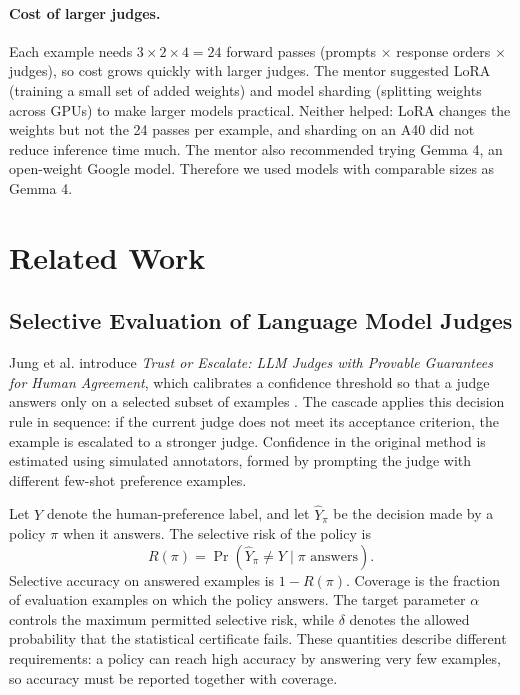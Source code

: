 \documentclass[11pt]{article}
\begin{document}
\paragraph{Cost of larger judges.} Each example needs $3\times2\times4=24$ forward passes (prompts $\times$ response orders $\times$ judges), so cost grows quickly with larger judges. The mentor suggested LoRA (training a small set of added weights) and model sharding (splitting weights across GPUs) to make larger models practical. Neither helped: LoRA changes the weights but not the 24 passes per example, and sharding on an A40 did not reduce inference time much. The mentor also recommended trying Gemma 4, an open-weight Google model. Therefore we used models with comparable sizes as Gemma 4.
\section{Related Work}

\subsection{Selective Evaluation of Language Model Judges}
Jung et al. introduce \emph{Trust or Escalate: LLM Judges with Provable Guarantees for Human Agreement}, which calibrates a confidence threshold so that a judge answers only on a selected subset of examples \citep{jung2024trust}. The cascade applies this decision rule in sequence: if the current judge does not meet its acceptance criterion, the example is escalated to a stronger judge. Confidence in the original method is estimated using simulated annotators, formed by prompting the judge with different few-shot preference examples.

Let $Y$ denote the human-preference label, and let $\widehat{Y}_{\pi}$ be the decision made by a policy $\pi$ when it answers. The selective risk of the policy is
\begin{equation}
R(\pi)=\Pr(\widehat{Y}_{\pi}\ne Y\mid \pi\text{ answers}).
\label{eq:selective-risk}
\end{equation}
Selective accuracy on answered examples is $1-R(\pi)$. Coverage is the fraction of evaluation examples on which the policy answers. The target parameter $\alpha$ controls the maximum permitted selective risk, while $\delta$ denotes the allowed probability that the statistical certificate fails. These quantities describe different requirements: a policy can reach high accuracy by answering very few examples, so accuracy must be reported together with coverage.
\end{document}
